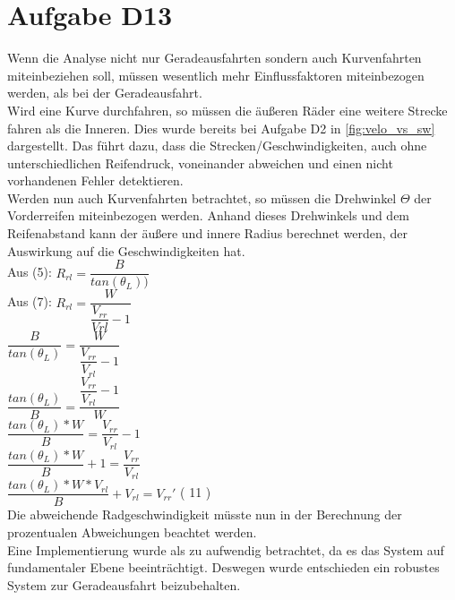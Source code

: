 \chapter{Aufgabe D13}

Wenn die Analyse nicht nur Geradeausfahrten sondern auch Kurvenfahrten miteinbeziehen soll, müssen wesentlich mehr Einflussfaktoren miteinbezogen werden, als bei der Geradeausfahrt.\\
Wird eine Kurve durchfahren, so müssen die äußeren Räder eine weitere Strecke fahren als die Inneren. Dies wurde bereits bei Aufgabe D2 in \autoref{fig:velo_vs_sw} dargestellt. Das führt dazu, dass die Strecken/Geschwindigkeiten, auch ohne unterschiedlichen Reifendruck, voneinander abweichen und einen nicht vorhandenen Fehler detektieren.\\
Werden nun auch Kurvenfahrten betrachtet, so müssen die Drehwinkel $\Theta$ der Vorderreifen miteinbezogen werden. Anhand dieses Drehwinkels und dem Reifenabstand kann der äußere und innere Radius berechnet werden, der Auswirkung auf die Geschwindigkeiten hat.\\

Aus (5): $R_{rl} = \dfrac{B}{tan(\theta_{L}))}$\\

Aus (7): $R_{rl} =  \dfrac{W}{\dfrac{V_{rr}}{V{rl}} -1}$\\

\hspace*{2.5cm} $\dfrac{B}{tan(\theta_{L})} = \dfrac{W}{\dfrac{V_{rr}}{V_{rl}}-1}$\\

\hspace*{2.5cm} $\dfrac{tan(\theta_{L})}{B} = \dfrac{\dfrac{V_{rr}}{V_{rl}} -1}{W}$\\

\hspace*{2.5cm} $\dfrac{tan(\theta_{L})*W}{B} = \dfrac{V_{rr}}{V_{rl}}-1$\\

\hspace*{2.5cm} $\dfrac{ tan(\theta_{L})*W}{B}+1 = \dfrac{V_{rr}}{V_{rl}}$\\

\hspace*{2.5cm} $\dfrac{ tan(\theta_{L})*W*V_{rl}}{B}+V_{rl} = V_{rr}'$  ( 11 )\\


 Die abweichende Radgeschwindigkeit müsste nun in der Berechnung der prozentualen Abweichungen beachtet werden.\\
 Eine Implementierung wurde als zu aufwendig betrachtet, da es das System auf fundamentaler Ebene beeinträchtigt. Deswegen wurde entschieden ein robustes System zur Geradeausfahrt beizubehalten.
 

